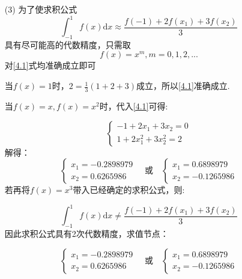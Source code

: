 \documentclass[a4paper]{article}
\begin{document}
\begin{enumerate}
    \item [(3)]
    为了使求积公式
    \begin{equation}
        \int_{-1}^{1} f(x) \mathrm{d} x \approx \frac{f(-1)+2 f\left(x_{1}\right)+3 f\left(x_{2}\right)}{3} \label{4.1}
    \end{equation}
    具有尽可能高的代数精度，只需取
    \begin{equation}
        f(x) = x^m, m=0, 1, 2, ...
    \end{equation}
    对\ref{4.1}式均准确成立即可\par
    当$f(x) = 1$时，$2 = \frac{1}{3}\left(1+2+3\right)$成立，所以\ref{4.1}准确成立. \par
    当$f(x) = x, f(x) = x^2$时，代入\ref{4.1}可得:\par
    \begin{equation}
        \left\{\begin{array}{l}-1+2 x_{1}+3 x_{2}=0 \\ 1+2 x_{1}^{2}+3 x_{2}^{2}=2\end{array}\right. 
    \end{equation}
    解得：
    \begin{equation}
        \left\{\begin{array}{l}x_{1}=-0.2898979 \\ x_{2}=0.6265986\end{array} \quad\right. \text{或}
    \quad\left\{\begin{array}{c}x_{1}=0.6898979 \\ x_{2}=-0.1265986\end{array}\right.
    \end{equation}
    若再将$f(x) = x^3$带入已经确定的求积公式，则:\par
    \begin{equation}
        \int_{-1}^{1} f(x) \mathrm{d} x \neq \frac{f(-1)+2 f\left(x_{1}\right)+3 f\left(x_{2}\right)}{3} 
    \end{equation}
    因此求积公式具有2次代数精度，求值节点：\par
    \begin{equation}
        \left\{\begin{array}{l}x_{1}=-0.2898979 \\ x_{2}=0.6265986\end{array} \quad\right. \text{或}
    \quad\left\{\begin{array}{c}x_{1}=0.6898979 \\ x_{2}=-0.1265986\end{array}\right.
    \end{equation}
\end{enumerate}
\end{document}
